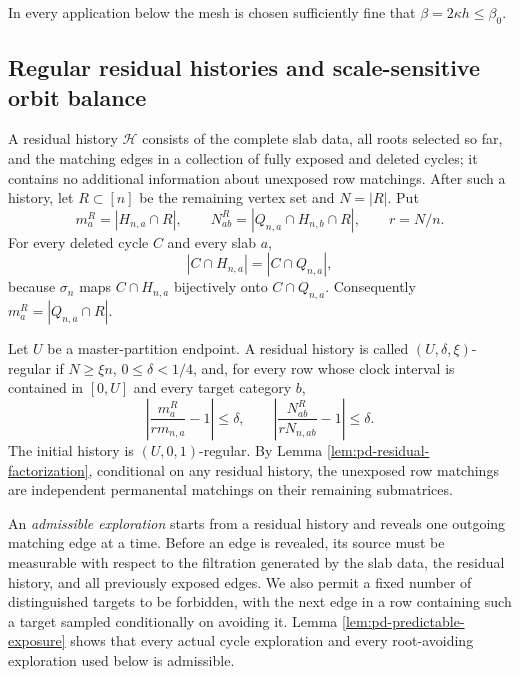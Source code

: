 \documentclass[11pt]{article}
\theoremstyle{remark}
\begin{document}
In every application below the mesh is chosen sufficiently fine that
$\beta=2\kappa h\le\beta_0$.

\subsection{Regular residual histories and scale-sensitive orbit balance}

A residual history $\mathcal H$ consists of the complete slab data, all roots
selected so far, and the matching edges in a collection of fully exposed and
deleted cycles; it contains no additional information about unexposed row
matchings.  After such a history, let $R\subset[n]$ be the remaining vertex set
and $N=|R|$.  Put
\[
 m_a^R=|H_{n,a}\cap R|,
 \qquad N_{ab}^R=|Q_{n,a}\cap H_{n,b}\cap R|,
 \qquad r=N/n.
\]
For every deleted cycle $C$ and every slab $a$,
\begin{equation}
        |C\cap H_{n,a}|=|C\cap Q_{n,a}|,
        \label{eq:pd-cycle-block-equality}
\end{equation}
because $\sigma_n$ maps $C\cap H_{n,a}$ bijectively onto
$C\cap Q_{n,a}$.  Consequently $m_a^R=|Q_{n,a}\cap R|$.

Let $U$ be a master-partition endpoint.  A residual history is called
$(U,\delta,\xi)$-regular if $N\ge\xi n$, $0\le\delta<1/4$, and, for every row
whose clock interval is contained in $[0,U]$ and every target category $b$,
\begin{equation}
 \left|\frac{m_a^R}{r m_{n,a}}-1\right|\le\delta,
 \qquad
 \left|\frac{N_{ab}^R}{r N_{n,ab}}-1\right|\le\delta.
 \label{eq:pd-regular-history}
\end{equation}
The initial history is $(U,0,1)$-regular.  By Lemma
\ref{lem:pd-residual-factorization}, conditional on any residual history, the
unexposed row matchings are independent permanental matchings on their
remaining submatrices.

An \emph{admissible exploration} starts from a residual history and reveals one
outgoing matching edge at a time.  Before an edge is revealed, its source must
be measurable with respect to the filtration generated by the slab data, the
residual history, and all previously exposed edges.  We also permit a fixed
number of distinguished targets to be forbidden, with the next edge in a row
containing such a target sampled conditionally on avoiding it.  Lemma
\ref{lem:pd-predictable-exposure} shows that every actual cycle exploration and
every root-avoiding exploration used below is admissible.
\end{document}
